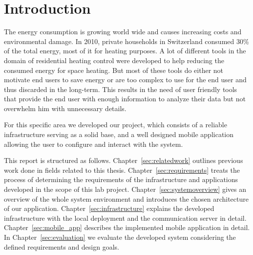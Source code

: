 
\chapter{Introduction}
\label{sec:introduction}



The energy consumption is growing world wide and causes increasing costs and environmental damage.
In 2010, private households in Switzerland consumed 30\% of the total energy, most of it for heating purposes\cite{x}.
A lot of different tools in the domain of residential heating control were developed to help reducing the consumed energy for space heating.
But most of these tools do either not motivate end users to save energy or are too complex to use for the end user and thus discarded in the long-term.
This results in the need of user friendly tools that provide the end user with enough information to analyze their data but not overwhelm him with unnecessary details.


For this specific area we developed our project, which consists of a reliable infrastructure serving as a solid base, and a well designed mobile application allowing the user to configure and interact with the system.

This report is structured as follows.
Chapter~\ref{sec:relatedwork} outlines previous work done in fields related to this thesis.
Chapter~\ref{sec:requirements} treats the process of determining the requirements of the infrastructure and applications developed in the scope of this lab project.
Chapter~\ref{sec:systemoverview} gives an overview of the whole system environment and introduces the chosen architecture of our application.
Chapter~\ref{sec:infrastructure} explains the developed infrastructure with the local deployment and the communication server in detail.
Chapter~\ref{sec:mobile_app} describes the implemented mobile application in detail.
In Chapter~\ref{sec:evaluation} we evaluate the developed system considering the defined requirements and design goals.



